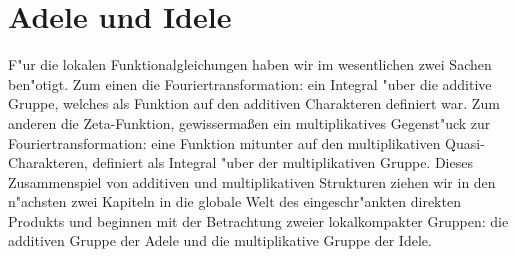 \section{Adele und Idele}\label{sec:adeleidele} 
	F"ur die lokalen Funktionalgleichungen haben wir im wesentlichen zwei Sachen ben"otigt.
	Zum einen die Fouriertransformation: ein Integral "uber die additive Gruppe, welches als Funktion auf den additiven Charakteren definiert war.
	Zum anderen die Zeta-Funktion, gewissermaßen ein multiplikatives Gegenst"uck zur Fouriertransformation: eine Funktion mitunter auf den multiplikativen Quasi-Charakteren, definiert als Integral "uber der multiplikativen Gruppe.
	Dieses Zusammenspiel von additiven und multiplikativen Strukturen ziehen wir in den n"achsten zwei Kapiteln in die globale Welt des eingeschr"ankten direkten Produkts und beginnen mit der Betrachtung zweier lokalkompakter Gruppen: die additiven Gruppe der Adele und die multiplikative Gruppe der Idele.
